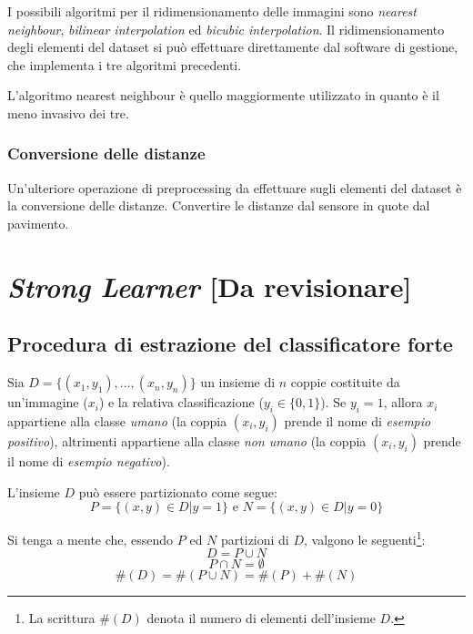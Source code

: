                 I possibili algoritmi per il ridimensionamento delle immagini sono \emph{nearest neighbour}, \emph{bilinear interpolation} ed \emph{bicubic interpolation}.
                Il ridimensionamento degli elementi del dataset si può effettuare direttamente dal software di gestione, che implementa i tre algoritmi precedenti.

                L'algoritmo nearest neighbour è quello maggiormente utilizzato in quanto è il meno invasivo dei tre.

            \subsubsection{Conversione delle distanze}
                Un'ulteriore operazione di preprocessing da effettuare sugli elementi del dataset è la conversione delle distanze.
                Convertire le distanze dal sensore in quote dal pavimento.

    \section{\emph{Strong Learner} [Da revisionare]}
    \label{sec:strong_learner}
        \subsection{Procedura di estrazione del classificatore forte}
            Sia $D = \{(x_1, y_1), ..., (x_n, y_n)\}$ un insieme di $n$ coppie costituite da un'immagine ($x_i$) e la relativa classificazione ($y_i \in \{ 0, 1 \}$). Se $y_i = 1$, allora $x_i$ appartiene alla classe \emph{umano} (la coppia $(x_i, y_i)$ prende il nome di \emph{esempio positivo}), altrimenti appartiene alla classe \emph{non umano} (la coppia $(x_i, y_i)$ prende il nome di \emph{esempio negativo}).

            L'insieme $D$ può essere partizionato come segue:
            $$P = \{(x, y) \in D | y = 1\} \text{ e } N = \{(x,y) \in D | y = 0\}$$

            Si tenga a mente che, essendo $P$ ed $N$ partizioni di $D$, valgono le seguenti\footnote{La scrittura $\#(D)$ denota il numero di elementi dell'insieme $D$.}:
            \begin{equation}
                D = P \cup N
            \end{equation}
            \begin{equation}
                P \cap N = \emptyset
            \end{equation}
            \begin{equation}
                \#(D) = \#(P \cup N) = \#(P) + \#(N)
            \end{equation}

